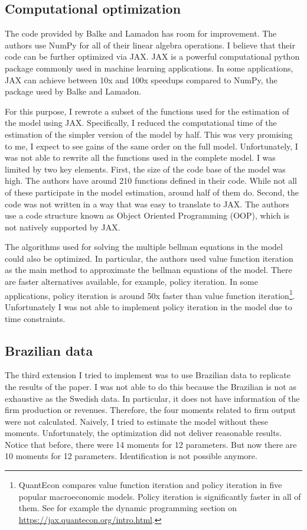 \documentclass{article}
\begin{document}
\subsection{Computational optimization}

The code provided by Balke and Lamadon has room for improvement. The authors use NumPy for all of their linear algebra operations. I believe that their code can be further optimized via JAX. JAX is a powerful computational python package commonly used in machine learning applications. In some applications, JAX can achieve between 10x and 100x speedups compared to NumPy, the package used by Balke and Lamadon.

For this purpose, I rewrote a subset of the functions used for the estimation of the model using JAX. Specifically, I reduced the computational time of the estimation of the simpler version of the model by half. This was very promising to me, I expect to see gains of the same order on the full model. Unfortunately, I was not able to rewrite all the functions used in the complete model. I was limited by two key elements. First, the size of the code base of the model was high. The authors have around 210 functions defined in their code. While not all of these participate in the model estimation, around half of them do. Second, the code was not written in a way that was easy to translate to JAX. The authors use a code structure known as Object Oriented Programming (OOP), which is not natively supported by JAX.

The algorithms used for solving the multiple bellman equations in the model could also be optimized. In particular, the authors used value function iteration as the main method to approximate the bellman equations of the model. There are faster alternatives available, for example, policy iteration. In some applications, policy iteration is around 50x faster than value function iteration\footnote{QuantEcon compares value function iteration and policy iteration in five popular macroeconomic models. Policy iteration is significantly faster in all of them. See for example the dynamic programming section on \url{https://jax.quantecon.org/intro.html}.}. Unfortunately I was not able to implement policy iteration in the model due to time constraints.


\subsection{Brazilian data}

The third extension I tried to implement was to use Brazilian data to replicate the results of the paper. I was not able to do this because the Brazilian is not as exhaustive as the Swedish data. In particular, it does not have information of the firm production or revenues. Therefore, the four moments related to firm output were not calculated. Naively, I tried to estimate the model without these moments. Unfortunately, the optimization did not deliver reasonable results. Notice that before, there were 14 moments for 12 parameters. But now there are 10 moments for 12 parameters. Identification is not possible anymore. 
\end{document}
